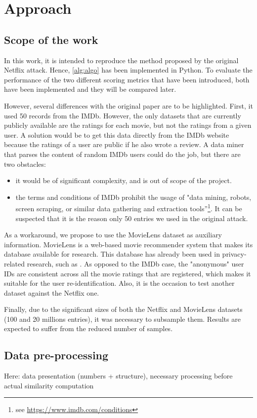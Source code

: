 \section{Approach}\label{sec:approach}

\subsection{Scope of the work}

In this work, it is intended to reproduce the method proposed by the original Netflix attack. Hence, \autoref{alg:algo} has been implemented in Python. To evaluate the performance of the two different scoring metrics that have been introduced, both have been implemented and they will be compared later.

However, several differences with the original paper are to be highlighted. First, it used 50 records from the IMDb. However, the only datasets that are currently publicly available are the ratings for each movie, but not the ratings from a given user. A solution would be to get this data directly from the IMDb website because the ratings of a user are public if he also wrote a review. A data miner that parses the content of random IMDb users could do the job, but there are two obstacles:

\begin{itemize}
	\item it would be of significant complexity, and is out of scope of the project.
	\item the terms and conditions of IMDb prohibit the usage of "data mining, robots, screen scraping, or similar data gathering and extraction tools”\footnote{see \url{https://www.imdb.com/conditions}}. It can be suspected that it is the reason only 50 entries we used in the original attack. 
\end{itemize}

As a workaround, we propose to use the MovieLens dataset as auxiliary information. MovieLens is a web-based movie recommender system that makes its database available for research. This database has already been used in privacy-related research, such as \cite{movielens}. As opposed to the IMDb case, the "anonymous" user IDs are consistent across all the movie ratings that are registered, which makes it suitable for the user re-identification. Also, it is the occasion to test another dataset against the Netflix one.

Finally, due to the significant sizes of both the Netflix and MovieLens datasets (100 and 20 millions entries), it was necessary to subsample them. Results are expected to suffer from the reduced number of samples.

\subsection{Data pre-processing}

Here: data presentation (numbers + structure), necessary processing before actual similarity computation